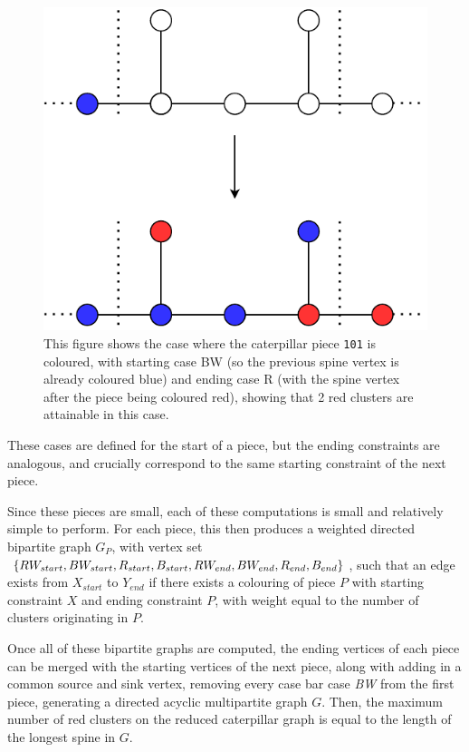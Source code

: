 \documentclass{mpaper}
\begin{document}
\begin{figure}
    \centering
    \includegraphics[scale=0.75]{mpaper/figures/CaterpillarPieceColouring.pdf}
    \caption{This figure shows the case where the caterpillar piece \texttt{101} is coloured, with starting case BW (so the previous spine vertex is already coloured blue) and ending case R (with the spine vertex after the piece being coloured red), showing that 2 red clusters are attainable in this case.}
    \label{fig/caterpillar-piece-colouring}
\end{figure}

These cases are defined for the start of a piece, but the ending constraints are analogous, and crucially correspond to the same starting constraint of the next piece.

Since these pieces are small, each of these computations is small and relatively simple to perform. For each piece, this then produces a weighted directed bipartite graph $G_P$, with vertex set $\{RW_{start}, BW_{start}, R_{start}, B_{start}, \\ RW_{end}, BW_{end}, R_{end}, B_{end}\}$, such that an edge exists from $X_{start}$ to $Y_{end}$ if there exists a colouring of piece $P$ with starting constraint $X$ and ending constraint $P$, with weight equal to the number of clusters originating in $P$.

Once all of these bipartite graphs are computed, the ending vertices of each piece can be merged with the starting vertices of the next piece, along with adding in a common source and sink vertex, removing every case bar case \emph{BW} from the first piece, generating a directed acyclic multipartite graph $G$. Then, the maximum number of red clusters on the reduced caterpillar graph is equal to the length of the longest spine in $G$.
\end{document}
